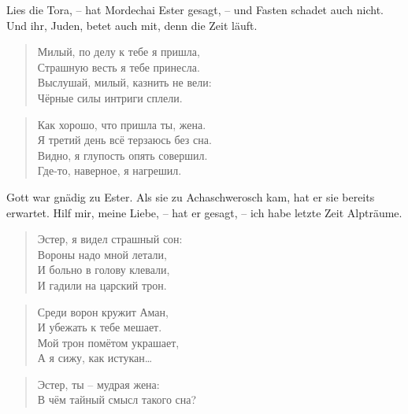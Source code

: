 \documentclass[12pt,a4paper,titlepage]{article}
\begin{document}
\begin{drama}
Lies die Tora, -- hat Mordechai Ester gesagt, -- und Fasten
schadet auch nicht. Und ihr, Juden, betet auch mit, denn die Zeit läuft.


\scene


\espeaks {}
\begin{verse}
Милый, по делу к тебе я пришла,\\
Страшную весть я тебе принесла.\\
Выслушай, милый, казнить не вели:\\
Чёрные силы интриги сплели.\\
\end{verse}

\ahspeaks {}
\begin{verse}
Как хорошо, что пришла ты, жена.\\
Я третий день всё терзаюсь без сна.\\
Видно, я глупость опять совершил.\\
Где-то, наверное, я нагрешил.\\
\end{verse}


\uespeaks
Gott war gnädig zu Ester. Als sie zu Achaschwerosch kam, hat er sie
bereits erwartet. Hilf mir, meine Liebe, -- hat er gesagt, -- ich habe letzte Zeit Alpträume.


\ahspeaks {}
\begin{verse}
Эстер, я видел страшный сон:\\
Вороны надо мной летали,\\
И больно в голову клевали,\\
И гадили на царский трон.\\
\end{verse}

\begin{verse}
Среди ворон кружит Аман,\\
И убежать к тебе мешает.\\
Мой трон помётом украшает,\\
А я сижу, как истукан\ldots\\
\end{verse}

\begin{verse}
Эстер, ты -- мудрая жена:\\
В чём тайный смысл такого сна?\\
\end{verse}



\end{drama}
\end{document}
